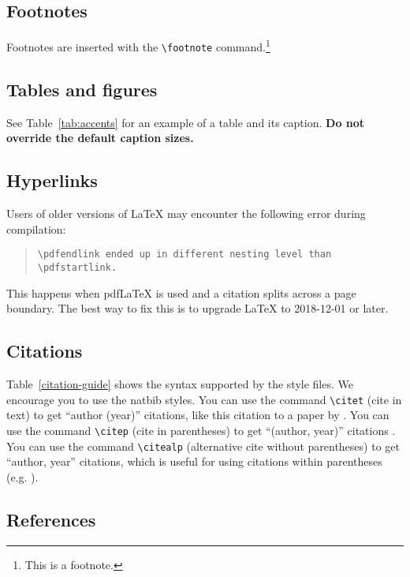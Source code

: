 \documentclass[11pt]{article}
\begin{document}
\subsection{Footnotes}

Footnotes are inserted with the \verb|\footnote| command.\footnote{This is a footnote.}

\subsection{Tables and figures}

See Table~\ref{tab:accents} for an example of a table and its caption.
\textbf{Do not override the default caption sizes.}

\subsection{Hyperlinks}

Users of older versions of \LaTeX{} may encounter the following error during compilation: 
\begin{quote}
\tt\verb|\pdfendlink| ended up in different nesting level than \verb|\pdfstartlink|.
\end{quote}
This happens when pdf\LaTeX{} is used and a citation splits across a page boundary. The best way to fix this is to upgrade \LaTeX{} to 2018-12-01 or later.

\subsection{Citations}



Table~\ref{citation-guide} shows the syntax supported by the style files.
We encourage you to use the natbib styles.
You can use the command \verb|\citet| (cite in text) to get ``author (year)'' citations, like this citation to a paper by \citet{Gusfield:97}.
You can use the command \verb|\citep| (cite in parentheses) to get ``(author, year)'' citations \citep{Gusfield:97}.
You can use the command \verb|\citealp| (alternative cite without parentheses) to get ``author, year'' citations, which is useful for using citations within parentheses (e.g. \citealp{Gusfield:97}).

\subsection{References}

\nocite{Ando2005,augenstein-etal-2016-stance,andrew2007scalable,rasooli-tetrault-2015,goodman-etal-2016-noise,harper-2014-learning}
\end{document}
